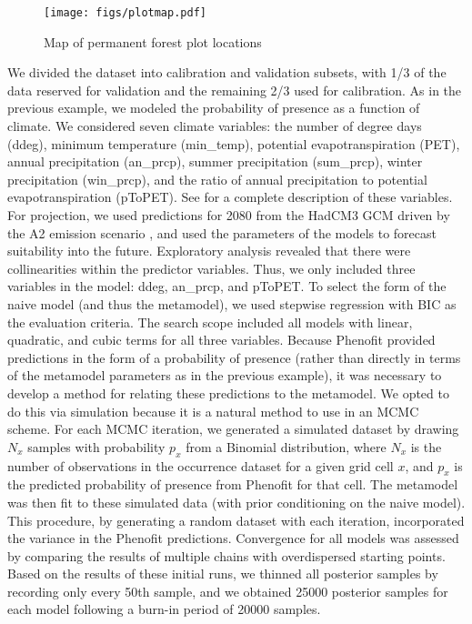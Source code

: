 \documentclass[11pt]{article}
\begin{document}
\begin{figure}[t]
\texttt{[image: figs/plotmap.pdf]}
\caption{Map of permanent forest plot locations}
\label{fig:plotmap}
\end{figure}

We divided the dataset into calibration and validation subsets, with 1/3 of the data reserved for validation and the remaining 2/3 used for calibration.
As in the previous example, we modeled the probability of presence as a function of climate.
We considered seven climate variables: the number of degree days (ddeg), minimum temperature (min\_temp), potential evapotranspiration (PET), annual precipitation (an\_prcp), summer precipitation (sum\_prcp), winter precipitation (win\_prcp), and the ratio of annual precipitation to potential evapotranspiration (pToPET).
See \citet{Morin2009} for a complete description of these variables.
For projection, we used predictions for 2080 from the HadCM3 GCM \citep{Pope2000} driven by the A2 emission scenario \citep{Nakicenovic2000}, and used the parameters of the models to forecast suitability into the future.
Exploratory analysis revealed that there were collinearities within the predictor variables.
Thus, we only included three variables in the model: ddeg, an\_prcp, and pToPET.
To select the form of the naive model (and thus the metamodel), we used stepwise regression with BIC as the evaluation criteria.
The search scope included all models with linear, quadratic, and cubic terms for all three variables.
Because Phenofit provided predictions in the form of a probability of presence (rather than directly in terms of the metamodel parameters as in the previous example), it was necessary to develop a method for relating these predictions to the metamodel.
We opted to do this via simulation because it is a natural method to use in an MCMC scheme.
For each MCMC iteration, we generated a simulated dataset by drawing \(N_x\) samples with probability \(p_x\) from a Binomial distribution, where \(N_x\) is the number of observations in the occurrence dataset for a given grid cell \(x\), and \(p_x\) is the predicted probability of presence from Phenofit for that cell.
The metamodel was then fit to these simulated data (with prior conditioning on the naive model).
This procedure, by generating a random dataset with each iteration, incorporated the variance in the Phenofit predictions.
Convergence for all models was assessed by comparing the results of multiple chains with overdispersed starting points.
Based on the results of these initial runs, we thinned all posterior samples by recording only every 50th sample, and we obtained 25000 posterior samples for each model following a burn-in period of 20000 samples.

\renewcommand\refname{Literature Cited}
{}

\end{document}
